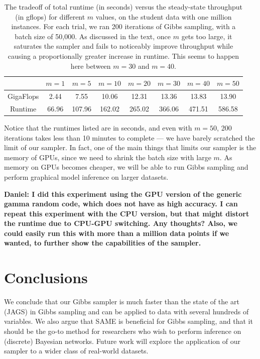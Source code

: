 \documentclass{article} %
\begin{document}
\begin{table}[t]
\caption{The tradeoff of total runtime (in seconds) versus the steady-state throughput (in gflops)
for different $m$ values, on the student data with one million instances. For each trial, we ran 200
iterations of Gibbs sampling, with a batch size of 50,000. As discussed in the text, once $m$ gets
too large, it saturates the sampler and fails to noticeably improve throughput while causing a
proportionally greater increase in runtime. This seems to happen here between $m=30$ and $m=40$.}
\label{tab:tradeoff}
\begin{center}
\begin{tabular}{ |c|c|c|c|c|c|c|c| } 
\hline
          & $m=1$ & $m=5$  & $m=10$ & $m=20$ & $m=30$  & $m=40$  & $m=50$  \\
\hline \hline
GigaFlops & 2.44  & 7.55   & 10.06  & 12.31  & 13.36  & 13.83  & 13.90   \\ 
Runtime   & 66.96 & 107.96 & 162.02 & 265.02 & 366.06 & 471.51 & 586.58  \\
\hline
\end{tabular}
\end{center}
\end{table}

Notice that the runtimes listed are in seconds, and even with $m=50$, 200 iterations takes less than
10 minutes to complete --- we have barely scratched the limit of our sampler. In fact, one of the
main things that limits our sampler is the memory of GPUs, since we need to shrink the batch size
with large $m$. As memory on GPUs becomes cheaper, we will be able to run Gibbs sampling and perform
graphical model inference on larger datasets.

\textbf{Daniel: I did this experiment using the GPU version of the generic gamma random code, which
does not have as high accuracy. I can repeat this experiment with the CPU version, but that might
distort the runtime due to CPU-GPU switching. Any thoughts? Also, we could easily run this with more
than a million data points if we wanted, to further show the capabilities of the sampler.}



\section{Conclusions}\label{sec:conclusions}

We conclude that our Gibbs sampler is much faster than the state of the art (JAGS) in Gibbs sampling
and can be applied to data with several hundreds of variables. We also argue that SAME is beneficial
for Gibbs sampling, and that it should be the go-to method for researchers who wish to perform
inference on (discrete) Bayesian networks. Future work will explore the application of our sampler
to a wider class of real-world datasets.
\end{document}
